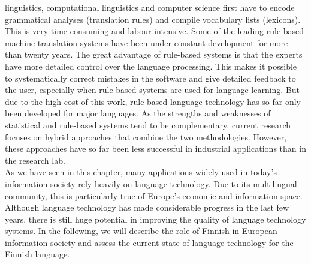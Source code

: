 \begin{multicols}{2}
linguistics, computational linguistics and computer science first have to
encode grammatical analyses (translation rules) and compile vocabulary lists
(lexicons). This is very time consuming and labour intensive. Some of the
leading rule-based machine translation systems have been under constant
development for more than twenty years. The great advantage of rule-based
systems is that the experts have more detailed control over the language
processing. This makes it possible to systematically correct mistakes in the
software and give detailed feedback to the user, especially when rule-based
systems are used for language learning. But due to the high cost of this work,
rule-based language technology has so far only been developed for major
languages.
As the strengths and weaknesses of statistical and rule-based systems tend to
be complementary, current research focuses on hybrid approaches that combine
the two methodologies. However, these approaches have so far been less
successful in industrial applications than in the research lab.\\
As we have seen in this chapter, many applications widely used in today’s
information society rely heavily on language technology. Due to its
multilingual community, this is particularly true of Europe’s economic and
information space. Although language technology has made considerable progress
in the last few years, there is still huge potential in improving the quality
of language technology systems. In the following, we will describe the role of
Finnish in European information society and assess the current state of
language technology for the Finnish language.

\end{multicols}
\clearpage
{}
